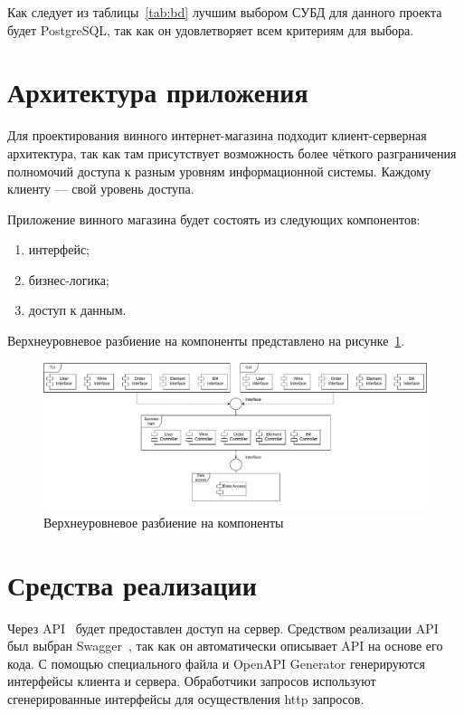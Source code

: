 Как следует из таблицы~\ref{tab:bd} лучшим выбором СУБД для данного проекта будет PostgreSQL, так как он удовлетворяет всем критериям для выбора.


\section{Архитектура приложения}

Для проектирования винного интернет-магазина подходит клиент-серверная архитектура, так как там присутствует возможность более чёткого разграничения полномочий доступа к разным уровням информационной системы. Каждому клиенту — свой уровень доступа. 

Приложение винного магазина будет состоять из следующих компонентов:
\begin{enumerate}[label*=---]
	\item интерфейс;
	\item бизнес-логика;
	\item доступ к данным.
\end{enumerate} 
Верхнеуровневое разбиение на компоненты представлено на рисунке~\ref{img:upper}.
\begin{figure}[!h]
	\centering
	\includegraphics[scale=0.5]{inc/img/components.pdf}
	\caption{Верхнеуровневое разбиение на компоненты}
	\label{img:upper}
\end{figure}

\section{Средства реализации}
Через API~\cite{api} будет предоставлен доступ на сервер. Средством реализации API был выбран Swagger~\cite{swagger}, так как он автоматически описывает API на основе его кода. С помощью специального файла и OpenAPI
Generator генерируются интерфейсы клиента и сервера. Обработчики запросов используют сгенерированные интерфейсы для осуществления http запросов.

